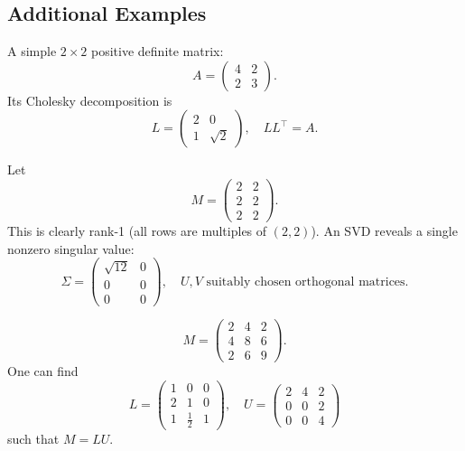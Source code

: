 \subsection{Additional Examples}
\begin{example}[2x2 Cholesky]
A simple $2\times 2$ positive definite matrix:
\[
A = \begin{pmatrix} 
4 & 2 \\ 
2 & 3 
\end{pmatrix}.
\]
Its Cholesky decomposition is 
\[
L = \begin{pmatrix}
2 & 0 \\
1 & \sqrt{2}
\end{pmatrix},
\quad 
L L^\top = A.
\]
\end{example}

\begin{example}
Let 
\[
M = \begin{pmatrix}
2 & 2 \\
2 & 2 \\
2 & 2
\end{pmatrix}.
\]
This is clearly rank-1 (all rows are multiples of $(2, 2)$). 
An SVD reveals a single nonzero singular value:
\[
\Sigma = \begin{pmatrix}
\sqrt{12} & 0 \\
0 & 0 \\
0 & 0
\end{pmatrix}, 
\quad U, V \text{ suitably chosen orthogonal matrices.}
\]
\end{example}

\begin{example}[LU Example]
\[
M = \begin{pmatrix}
2 & 4 & 2\\
4 & 8 & 6\\
2 & 6 & 9
\end{pmatrix}.
\]
One can find 
\[
L = \begin{pmatrix}
1 & 0 & 0 \\
2 & 1 & 0 \\
1 & \frac{1}{2} & 1
\end{pmatrix},
\quad
U = \begin{pmatrix}
2 & 4 & 2 \\
0 & 0 & 2 \\
0 & 0 & 4
\end{pmatrix}
\]
such that $M = LU$.
\end{example}



